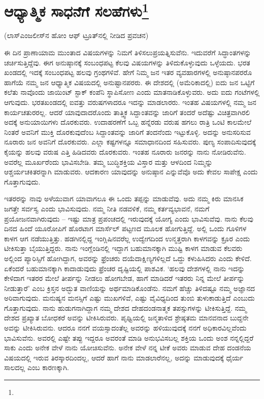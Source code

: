 
\chapter[ಆಧ್ಯಾತ್ಮಿಕ ಸಾಧನೆಗೆ ಸಲಹೆಗಳು]{ಆಧ್ಯಾತ್ಮಿಕ ಸಾಧನೆಗೆ ಸಲಹೆಗಳು\protect\footnote{}}

\begin{center}
(ಲಾಸ್‌ಎಂಜಲೀಸ್‌ನ ಹೋಂ ಆಫ್ ಟ್ರೂತ್‌ನಲ್ಲಿ ನೀಡಿದ ಪ್ರವಚನ)
\end{center}

ಈ ದಿನ ಪ್ರಾಣಾಯಾಮ ಮುಂತಾದ ವಿಷಯಗಳನ್ನು ನಿಮಗೆ ತಿಳಿಸಲು\break ಪ್ರಯತ್ನಿಸುವೆನು. ಇದುವರೆಗೆ ಸಿದ್ಧಾಂತಗಳನ್ನು ಚರ್ಚಿಸುತ್ತಿದ್ದೆವು. ಈಗ ಅನುಷ್ಠಾನಕ್ಕೆ ಸಂಬಂಧಪಟ್ಟ ಕೆಲವು ವಿಷಯಗಳನ್ನು ತಿಳಿದುಕೊಳ್ಳುವುದು ಒಳ್ಳೆಯದು. ಭರತ ಖಂಡದಲ್ಲಿ ಇದಕ್ಕೆ ಸಂಬಂಧಪಟ್ಟ ಹಲವು ಗ್ರಂಥಗಳಿವೆ. ಹೇಗೆ ನಿಮ್ಮ ಜನ ಇತರ ವ್ಯವಹಾರಗಳಲ್ಲಿ ಅನುಷ್ಠಾನಪರರೊ ಹಾಗೆಯೆ ನಮ್ಮ ಜನ ಆಧ್ಯಾತ್ಮಿಕ ವಿಷಯದಲ್ಲಿ ಅನುಷ್ಟಾನಪರರು. ಈ ದೇಶದಲ್ಲಿ (ಅಮೆರಿಕಾದಲ್ಲಿ) ಐದು ಜನ ಒಟ್ಟಿಗೆ ಕಲೆತು ನಾವೊಂದು ಜಾಯಿಂಟ್ ಸ್ಟಾಕ್ ಕಂಪೆನಿ ಸ್ಥಾಪಿಸೋಣ ಎಂದು ಮಾತನಾಡಿಕೊಳ್ಳುವರು. ಅದು ಐದು ಗಂಟೆಗಳಲ್ಲಿ ಆಗುವುದು. ಭರತಖಂಡದಲ್ಲಿ ಐವತ್ತು ವರುಷಗಳಾದರೂ ಇದನ್ನು ಮಾಡಲಾರರು. ಇಂತಹ ವಿಷಯಗಳಲ್ಲಿ ನಮ್ಮ ಜನ ಕಾರ್ಯಚತುರರಲ್ಲ. ಆದರೆ ಯಾವುದಾದರೊಂದು ತಾತ್ತ್ವಿಕ ಸಿದ್ದಾಂತವನ್ನು ಜಾರಿಗೆ ತಂದರೆ ಅದೆಷ್ಟು ವಿಚಿತ್ರವಾಗಿರಲಿ ಅದಕ್ಕೆ ಅನುಯಾಯಿಗಳು ದೊರಕುವರು. ಉದಾಹರಣೆಗೆ ಒಬ್ಬ ಹನ್ನೆರಡು ವರುಷ ಹಗಲು ರಾತ್ರಿ ಒಂಟಿ ಕಾಲಮೇಲೆ ನಿಂತರೆ ಅವನಿಗೆ ಮುಕ್ತಿ ದೊರಕುವುದೆಂಬ ಸಿದ್ದಾಂತವನ್ನು ಜಾರಿಗೆ ತಂದನೆಂದು ಇಟ್ಟುಕೊಳ್ಳಿ. ಅದನ್ನು ಅನುಸರಿಸುವ ನೂರಾರು ಜನ ಅವನಿಗೆ ದೊರಕುವರು. ಎಲ್ಲಾ ಕಷ್ಟಗಳನ್ನೂ ಸಮಾಧಾನದಿಂದ ಸಹಿಸುವರು. ಪುಣ್ಯ ಸಂಪಾದಿಸುವುದಕ್ಕೆ ಕೈಯನ್ನು ಹಲವು ವರುಷ ಎತ್ತಿ ಹಿಡಿದವರು ದೊರಕುವರು. ಇಂತಹ ನೂರಾರು ಜನರನ್ನು ನಾನು ನೋಡಿರುವೆನು. ಅವರೆಲ್ಲ ಮೂರ್ಖರೆಂದು ಭಾವಿಸಬೇಡಿ. ತಮ್ಮ ಬುದ್ಧಿಶಕ್ತಿಯ ವಿಸ್ತಾರ ಮತ್ತು ಆಳದಿಂದ ನಿಮ್ಮನ್ನು ಆಶ್ಚರ್ಯಚಕಿತರನ್ನಾಗಿ ಮಾಡುವರು. ಆದಕಾರಣ ಯಾವುದನ್ನು ಅನುಷ್ಠಾನ ಎನ್ನುವೆವೊ ಅದು ಕೇವಲ ಸಾಪೇಕ್ಷ ಎಂದು ಗೊತ್ತಾಗುವುದು.

ಇತರರನ್ನು ನಾವು ಅಳೆಯುವಾಗ ಯಾವಾಗಲೂ ಈ ಒಂದು ತಪ್ಪನ್ನು ಮಾಡುವೆವು. ಅದು ನಮ್ಮ ಕಿರು ಮಾನಸಿಕ ಜಗತ್ತೇ ಸರ್ವಸ್ವ ಎಂದು ಭಾವಿಸುವುದು. ನಮ್ಮ ನೀತಿ ನಡವಳಿಕೆ, ನಮ್ಮ ಕರ್ತವ್ಯಭಾವನೆ, ನಮಗೆ ಪ್ರಯೋಜನವಾಗಿರುವುದು – ಇಷ್ಟು ಮಾತ್ರ ಪ್ರಪಂಚದಲ್ಲಿ ಇರುವುದಕ್ಕೆ ಯೋಗ್ಯ ಎಂದು ಭಾವಿಸುವೆವು. ನಾನು ಕೆಲವು ದಿನದ ಹಿಂದೆ ಯೂರೋಪಿಗೆ ಹೊರಟಾಗ ಮಾರ್ಸೆಲ್ ಪಟ್ಟಣದ ಮೂಲಕ ಹೋಗುತ್ತಿದ್ದೆ. ಅಲ್ಲಿ ಒಂದು ಗೂಳಿಗಳ ಕಾಳಗ ಆಗ ನಡೆಯುತ್ತಿತ್ತು. ಹಡಗಿನಲ್ಲಿದ್ದ ಇಂಗ್ಲಿಷಿನವರೆಲ್ಲ ಉದ್ವೇಗದಿಂದ ಉನ್ಮತ್ತರಾಗಿ ಕಾಳಗವನ್ನು ಕ್ರೂರ ಎಂದು ಟೀಕಿಸುತ್ತಾ ಬೈಯುತ್ತಿದ್ದರು. ನಾನು ಇಂಗ್ಲೆಂಡಿನಲ್ಲಿ ಇದ್ದಾಗ ಬಹುಮಾನಕ್ಕಾಗಿ ಮುಷ್ಟಿ ಕಾಳಗ ಮಾಡುವ ಕೆಲವರು ಅಲ್ಲಿಂದ ಪ್ಯಾರಿಸ್ಸಿಗೆ ಹೋಗಿದ್ದಾಗ, ಅವರನ್ನು ಫ್ರೆಂಚರು ದಯೆದಾಕ್ಷಿಣ್ಯಗಳಿಲ್ಲದೆ ಒದ್ದು ಕಳುಹಿಸಿದರು ಎಂದು ಕೇಳಿದೆ. ಏಕೆಂದರೆ ಬಹುಮಾನಕ್ಕಾಗಿ ಕಾದಾಡುವುದು ಫ್ರೆಂಚರ ದೃಷ್ಟಿಯಲ್ಲಿ ಪಾಶವಿಕ. `ಹಲವು ದೇಶಗಳಲ್ಲಿ ನಾನು ಇದನ್ನು ಕೇಳಿದಾಗ ಇತರರ ಮೇಲೆ ತೀರ್ಪನ್ನು ನೀಡಲು ಹೋಗಬೇಡ, ಹಾಗೆ ಮಾಡಿದರೆ ಇತರರು ನಿನ್ನ ಮೇಲೆ ತೀರ್ಪನ್ನು ನೀಡುತ್ತಾರೆ' ಎಂಬ ಕ್ರಿಸ್ತನ ಅದ್ಭುತ ವಾಣಿಯನ್ನು ಅರ್ಥಮಾಡಿಕೊಂಡೆನು. ನಮಗೆ ಹೆಚ್ಚು ತಿಳಿದಷ್ಟೂ ನಮ್ಮ ಅಜ್ಞಾನದ ಅರಿವಾಗುವುದು. ಮನುಷ್ಯನ ಮನಸ್ಸಿಗೆ ಎಷ್ಟು ಮುಖಗಳಿವೆ, ಎಷ್ಟು ವೈವಿಧ್ಯದಿಂದ ತುಂಬಿ ತುಳುಕಾಡುತ್ತಿದೆ ಎಂಬುದು ಗೊತ್ತಾಗುವುದು. ನಾನು ಹುಡುಗನಾಗಿದ್ದಾಗ ನಮ್ಮ ದೇಶದ ದೇಹದಂಡನಾತ್ಮಕ ತಪಸ್ಸುಗಳನ್ನು ಟೀಕಿಸುತ್ತಿದ್ದೆ. ನಮ್ಮ ದೇಶದ ಪ್ರಖ್ಯಾತ ಬೋಧಕರೆ ಅವನ್ನು ಟೀಕಿಸಿರುವರು. ಪೃಥ್ವಿಯಲ್ಲಿ ಜನ್ಮತಾಳಿದ ಶ್ರೇಷ್ಠತಮ ಮಾನವನಾದ ಬುದ್ದನೇ ಅವನ್ನು ಟೀಕಿಸಿರುವನು. ಆದರೂ ನನಗೆ ವಯಸ್ಸಾದಂತೆಲ್ಲ ಅವರನ್ನು ಹಳಿಯುವುದಕ್ಕೆ ನನಗೆ ಅಧಿಕಾರವಿಲ್ಲವೆಂದು ಭಾವಿಸುವೆನು. ಅವರಲ್ಲಿ ಎಷ್ಟೇ ತಪ್ಪು ಇದ್ದರೂ ಅವರಂತೆ ಮಾಡಿ ಅನುಭವಿಸಬಲ್ಲ ಶಕ್ತಿಯ ಒಂದು ಅಂಶ ನನ್ನಲ್ಲಿದ್ದರೆ ಸಾಕು ಎಂದು ಅನೇಕ ವೇಳೆ ನಾನು ಯೋಚಿಸುವೆನು. ಅನೇಕ ವೇಳೆ ನನ್ನ ಟೀಕೆ ಅವರು ಮಾಡುವ ದೇಹ ದಂಡನೆಯ ವಿಷಯದಲ್ಲಿ ಇರುವ ತಿರಸ್ಕಾರದಿಂದಲ್ಲ, ಆದರೆ ಹಾಗೆ ನಾನು ಮಾಡಲಾರೆನಲ್ಲ, ಅದನ್ನು ಮಾಡುವುದಕ್ಕೆ ಧೈರ್ಯ ಸಾಲದಲ್ಲ ಎಂಬ ಕಾರಣಕ್ಕಾಗಿ.

